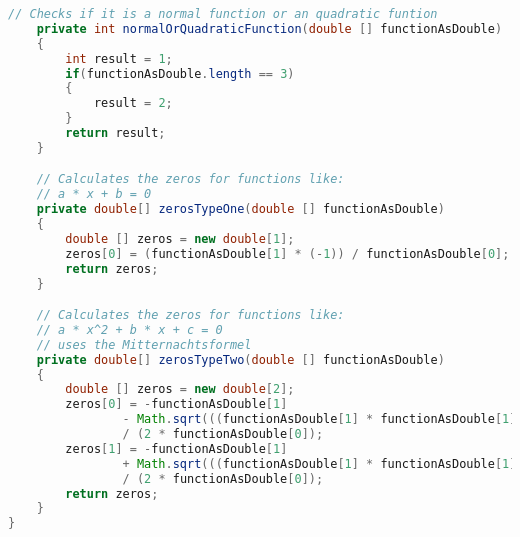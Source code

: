 \begin{lstlisting}[caption=Zeros (Keienburg),label=list:Zeros,language=Java]
    // Checks if it is a normal function or an quadratic funtion
    private int normalOrQuadraticFunction(double [] functionAsDouble)
    {
        int result = 1;
        if(functionAsDouble.length == 3)
        {
            result = 2;
        }
        return result;
    }

    // Calculates the zeros for functions like:
    // a * x + b = 0
    private double[] zerosTypeOne(double [] functionAsDouble)
    {
        double [] zeros = new double[1];
        zeros[0] = (functionAsDouble[1] * (-1)) / functionAsDouble[0];
        return zeros;
    }

    // Calculates the zeros for functions like:
    // a * x^2 + b * x + c = 0
    // uses the Mitternachtsformel
    private double[] zerosTypeTwo(double [] functionAsDouble)
    {
        double [] zeros = new double[2];
        zeros[0] = -functionAsDouble[1]
                - Math.sqrt(((functionAsDouble[1] * functionAsDouble[1]) - (4 * functionAsDouble[0] * functionAsDouble[2])) )
                / (2 * functionAsDouble[0]);
        zeros[1] = -functionAsDouble[1]
                + Math.sqrt(((functionAsDouble[1] * functionAsDouble[1]) - (4 * functionAsDouble[0] * functionAsDouble[2])) )
                / (2 * functionAsDouble[0]);
        return zeros;
    }
}
\end{lstlisting}    

